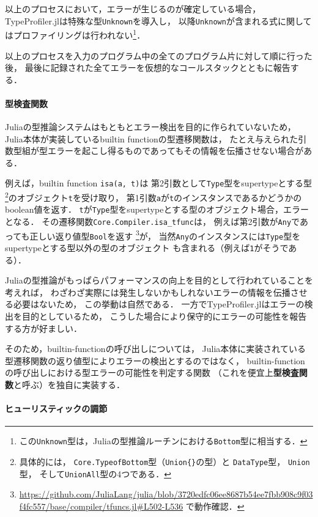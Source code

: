 以上のプロセスにおいて，エラーが生じるのが確定している場合，
TypeProfiler.jlは特殊な型\verb|Unknown|を導入し，
以降\verb|Unknown|が含まれる式に関してはプロファイリングは行われない\footnote{
  この\texttt{Unknown}型は，Juliaの型推論ルーチンにおける\texttt{Bottom}型に相当する．
}．

以上のプロセスを入力のプログラム中の全てのプログラム片に対して順に行った後，
最後に記録された全てエラーを仮想的なコールスタックとともに報告する．

\paragraph{型検査関数} \label{paragraph:type-check-function}

Juliaの型推論システムはもともとエラー検出を目的に作られていないため，
Julia本体が実装しているbuiltin functionの型遷移関数は，
たとえ与えられた引数型組が型エラーを起こし得るものであってもその情報を伝播させない場合がある．

例えば，builtin function \verb|isa(a, t)|は
第2引数として\verb|Type|型をsupertypeとする型\footnote{
  具体的には，
  \texttt{Core.TypeofBottom}型（\texttt{Union\{\}}の型）と
  \texttt{DataType}型，
  \texttt{Union}型，
  そして\texttt{UnionAll}型の4つである．
}のオブジェクト\verb|t|を受け取り，
第1引数\verb|a|が\verb|t|のインスタンスであるかどうかのboolean値を返す．
\verb|t|が\verb|Type|型をsupertypeとする型のオブジェクト場合，エラーとなる．
その遷移関数\verb|Core.Compiler.isa_tfunc|は，
例えば第2引数が\verb|Any|であっても正しい返り値型\verb|Bool|を返す
\footnote{
  \url{https://github.com/JuliaLang/julia/blob/3720edfc06ee8687b54ee7fbb908c9f03f4fc557/base/compiler/tfuncs.jl\#L502-L536}
  で動作確認．
}が，
当然\verb|Any|のインスタンスには\verb|Type|型をsupertypeとする型以外の型のオブジェクト
も含まれる（例えば\verb|1|がそうである）．

Juliaの型推論がもっぱらパフォーマンスの向上を目的として行われていることを考えれば，
わざわざ実際には発生しないかもしれないエラーの情報を伝播させる必要はないため，
この挙動は自然である．
一方でTypeProfiler.jlはエラーの検出を目的としているため，
こうした場合により保守的にエラーの可能性を報告する方が好ましい．

そのため，builtin-functionの呼び出しについては，
Julia本体に実装されている型遷移関数の返り値型によりエラーの検出とするのではなく，
builtin-functionの呼び出しにおける型エラーの可能性を判定する関数
（これを便宜上\textbf{型検査関数}と呼ぶ）を独自に実装する．

\paragraph{ヒューリスティックの調節} \label{paragraph:type-profiler-heuristic}

